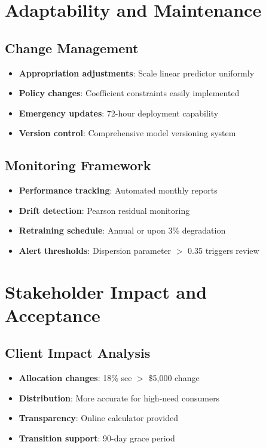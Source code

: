 \section{Adaptability and Maintenance}

\subsection{Change Management}

\begin{itemize}
    \item \textbf{Appropriation adjustments}: Scale linear predictor uniformly
    \item \textbf{Policy changes}: Coefficient constraints easily implemented
    \item \textbf{Emergency updates}: 72-hour deployment capability
    \item \textbf{Version control}: Comprehensive model versioning system
\end{itemize}

\subsection{Monitoring Framework}

\begin{itemize}
    \item \textbf{Performance tracking}: Automated monthly reports
    \item \textbf{Drift detection}: Pearson residual monitoring
    \item \textbf{Retraining schedule}: Annual or upon 3\% degradation
    \item \textbf{Alert thresholds}: Dispersion parameter $>$ 0.35 triggers review
\end{itemize}

\section{Stakeholder Impact and Acceptance}

\subsection{Client Impact Analysis}

\begin{itemize}
    \item \textbf{Allocation changes}: 18\% see $>$ \$5,000 change
    \item \textbf{Distribution}: More accurate for high-need consumers
    \item \textbf{Transparency}: Online calculator provided
    \item \textbf{Transition support}: 90-day grace period
\end{itemize}

